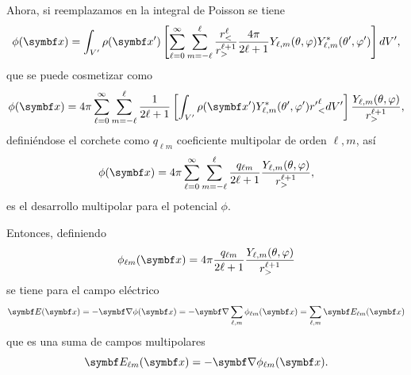 \documentclass[10pt,oneside]{CBFT_book}
\begin{document}
Ahora, si reemplazamos en la integral de Poisson se tiene
\[
	\phi(\vb{x})= \int_{V'} \rho(\vb{x}')\left[ \sum_{\ell=0}^\infty \sum_{m=-\ell}^\ell 
	\frac{r_<^\ell}{r_>^{\ell+1}}\frac{4\pi}{2\ell+1} Y_{\ell,m}(\theta,\varphi) 
	Y_{\ell,m}^*(\theta',\varphi')\right] dV',
\]
que se puede cosmetizar como
\[
	\phi(\vb{x})= 4\pi \sum_{\ell=0}^\infty \sum_{m=-\ell}^\ell \frac{1}{2\ell+1} \left[
	\int_{V'} \rho(\vb{x}') Y_{\ell,m}^*(\theta',\varphi') {r'}_<^\ell dV' \right] 
	\frac{Y_{\ell,m}(\theta,\varphi) }{r_>^{\ell+1}},
\]
definiéndose el corchete como $q_{\ell m}$ coeficiente multipolar de orden $\ell,m$, así
\[
	\phi(\vb{x})= 4\pi \sum_{\ell=0}^\infty \sum_{m=-\ell}^\ell \frac{q_{\ell m}}{2\ell+1} 
	\frac{Y_{\ell,m}(\theta,\varphi) }{r_>^{\ell+1}},
\]
es el desarrollo multipolar para el potencial $\phi$.

Entonces, definiendo 
\[
	\phi_{\ell m}(\vb{x})= 
	4\pi \frac{q_{\ell m}}{2\ell+1}\frac{Y_{\ell,m}(\theta,\varphi) }{r_>^{\ell+1}}
\]
se tiene para el campo eléctrico
\[
	\vb{E}(\vb{x}) = - \Nabla \phi(\vb{x})= 
	-\Nabla \sum_{\ell,m} \phi_{\ell m}(\vb{x}) =
	\sum_{\ell,m} \vb{E}_{\ell m}(\vb{x})
\]
que es una suma de campos multipolares
\[
	\vb{E}_{\ell m}(\vb{x}) = - \Nabla \phi_{\ell m}(\vb{x}).
\]
\end{document}

